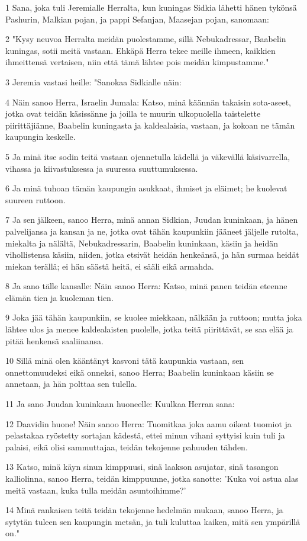 \par 1 Sana, joka tuli Jeremialle Herralta, kun kuningas Sidkia lähetti hänen tykönsä Pashurin, Malkian pojan, ja pappi Sefanjan, Maasejan pojan, sanomaan:
\par 2 "Kysy neuvoa Herralta meidän puolestamme, sillä Nebukadressar, Baabelin kuningas, sotii meitä vastaan. Ehkäpä Herra tekee meille ihmeen, kaikkien ihmeittensä vertaisen, niin että tämä lähtee pois meidän kimpustamme."
\par 3 Jeremia vastasi heille: "Sanokaa Sidkialle näin:
\par 4 Näin sanoo Herra, Israelin Jumala: Katso, minä käännän takaisin sota-aseet, jotka ovat teidän käsissänne ja joilla te muurin ulkopuolella taistelette piirittäjiänne, Baabelin kuningasta ja kaldealaisia, vastaan, ja kokoan ne tämän kaupungin keskelle.
\par 5 Ja minä itse sodin teitä vastaan ojennetulla kädellä ja väkevällä käsivarrella, vihassa ja kiivastuksessa ja suuressa suuttumuksessa.
\par 6 Ja minä tuhoan tämän kaupungin asukkaat, ihmiset ja eläimet; he kuolevat suureen ruttoon.
\par 7 Ja sen jälkeen, sanoo Herra, minä annan Sidkian, Juudan kuninkaan, ja hänen palvelijansa ja kansan ja ne, jotka ovat tähän kaupunkiin jääneet jäljelle rutolta, miekalta ja nälältä, Nebukadressarin, Baabelin kuninkaan, käsiin ja heidän vihollistensa käsiin, niiden, jotka etsivät heidän henkeänsä, ja hän surmaa heidät miekan terällä; ei hän säästä heitä, ei sääli eikä armahda.
\par 8 Ja sano tälle kansalle: Näin sanoo Herra: Katso, minä panen teidän eteenne elämän tien ja kuoleman tien.
\par 9 Joka jää tähän kaupunkiin, se kuolee miekkaan, nälkään ja ruttoon; mutta joka lähtee ulos ja menee kaldealaisten puolelle, jotka teitä piirittävät, se saa elää ja pitää henkensä saaliinansa.
\par 10 Sillä minä olen kääntänyt kasvoni tätä kaupunkia vastaan, sen onnettomuudeksi eikä onneksi, sanoo Herra; Baabelin kuninkaan käsiin se annetaan, ja hän polttaa sen tulella.
\par 11 Ja sano Juudan kuninkaan huoneelle: Kuulkaa Herran sana:
\par 12 Daavidin huone! Näin sanoo Herra: Tuomitkaa joka aamu oikeat tuomiot ja pelastakaa ryöstetty sortajan kädestä, ettei minun vihani syttyisi kuin tuli ja palaisi, eikä olisi sammuttajaa, teidän tekojenne pahuuden tähden.
\par 13 Katso, minä käyn sinun kimppuusi, sinä laakson asujatar, sinä tasangon kalliolinna, sanoo Herra, teidän kimppuunne, jotka sanotte: 'Kuka voi astua alas meitä vastaan, kuka tulla meidän asuntoihimme?'
\par 14 Minä rankaisen teitä teidän tekojenne hedelmän mukaan, sanoo Herra, ja sytytän tuleen sen kaupungin metsän, ja tuli kuluttaa kaiken, mitä sen ympärillä on."

